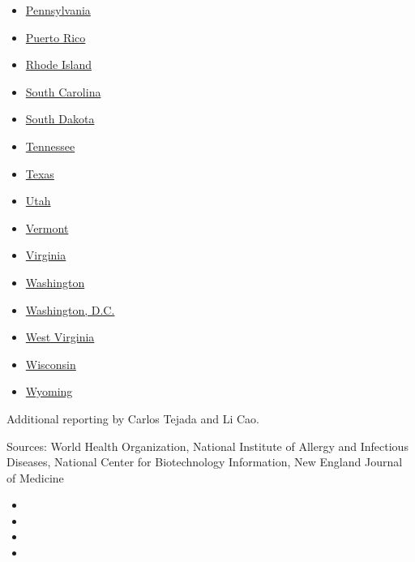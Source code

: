 \begin{itemize}
\item
  \href{https://www.nytimes.com/interactive/2020/us/pennsylvania-coronavirus-cases.html}{Pennsylvania}
\item
  \href{https://www.nytimes.com/interactive/2020/us/puerto-rico-coronavirus-cases.html}{Puerto
  Rico}
\item
  \href{https://www.nytimes.com/interactive/2020/us/rhode-island-coronavirus-cases.html}{Rhode
  Island}
\item
  \href{https://www.nytimes.com/interactive/2020/us/south-carolina-coronavirus-cases.html}{South
  Carolina}
\item
  \href{https://www.nytimes.com/interactive/2020/us/south-dakota-coronavirus-cases.html}{South
  Dakota}
\item
  \href{https://www.nytimes.com/interactive/2020/us/tennessee-coronavirus-cases.html}{Tennessee}
\item
  \href{https://www.nytimes.com/interactive/2020/us/texas-coronavirus-cases.html}{Texas}
\item
  \href{https://www.nytimes.com/interactive/2020/us/utah-coronavirus-cases.html}{Utah}
\item
  \href{https://www.nytimes.com/interactive/2020/us/vermont-coronavirus-cases.html}{Vermont}
\item
  \href{https://www.nytimes.com/interactive/2020/us/virginia-coronavirus-cases.html}{Virginia}
\item
  \href{https://www.nytimes.com/interactive/2020/us/washington-coronavirus-cases.html}{Washington}
\item
  \href{https://www.nytimes.com/interactive/2020/us/washington-dc-coronavirus-cases.html}{Washington,
  D.C.}
\item
  \href{https://www.nytimes.com/interactive/2020/us/west-virginia-coronavirus-cases.html}{West
  Virginia}
\item
  \href{https://www.nytimes.com/interactive/2020/us/wisconsin-coronavirus-cases.html}{Wisconsin}
\item
  \href{https://www.nytimes.com/interactive/2020/us/wyoming-coronavirus-cases.html}{Wyoming}
\end{itemize}

Additional reporting by Carlos Tejada and Li Cao.

Sources: World Health Organization, National Institute of Allergy and
Infectious Diseases, National Center for Biotechnology Information, New
England Journal of Medicine

\begin{itemize}
\item
\item
\item
\item
\end{itemize}

